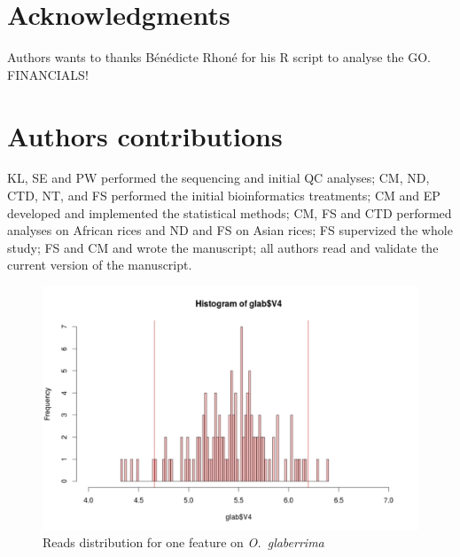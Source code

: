 \documentclass[10pt,letterpaper]{article}
\begin{document}
\section*{Acknowledgments}
Authors wants to thanks Bénédicte Rhoné for his R script to analyse the GO.
FINANCIALS!


\section*{Authors contributions}
KL, SE and PW performed the sequencing and initial QC analyses; CM, ND, CTD, NT, and FS performed the initial bioinformatics treatments; CM and EP developed and implemented the statistical methods; CM, FS and CTD performed analyses on African rices and ND and FS on Asian rices; FS supervized the whole study; FS and CM and wrote the manuscript; all authors read and validate the current version of the manuscript.


\nolinenumbers

\begin{figure}
\centering
 \includegraphics[scale=0.7]{readsDistri.pdf}
 \caption{Reads distribution for one feature on \emph{O.~glaberrima}}
 \label{distri}
\end{figure}
\end{document}
